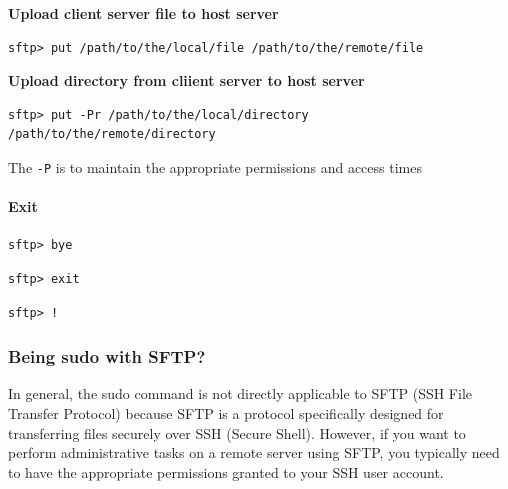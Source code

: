 \documentclass{article}
\newenvironment{blocktemplateI}[1]{%
    \tcolorbox[beamer,%
    noparskip,breakable,
    colframe=Violet,%
    colbacklower=Black,%
    title=#1]}%
    {\endtcolorbox}
\newenvironment{codetemplate}[1][]{%
  \mybasecolorbox[#1]
  \itshape
}{%
  \endmybasecolorbox
}
\begin{document}
\textbf{Upload client server file to host server}
\begin{codetemplate}{}
\begin{verbatim}
sftp> put /path/to/the/local/file /path/to/the/remote/file
\end{verbatim}
\end{codetemplate}

\textbf{Upload directory from cliient server to host server}
\begin{codetemplate}{}
\begin{verbatim}
sftp> put -Pr /path/to/the/local/directory /path/to/the/remote/directory
\end{verbatim}
\end{codetemplate}

\begin{blocktemplateI}{NOTE}
The \verb|-P| is to maintain the appropriate permissions and access times
\end{blocktemplateI}

\paragraph{Exit}
\begin{codetemplate}{}
\begin{verbatim}
sftp> bye
\end{verbatim}
\end{codetemplate}

\begin{codetemplate}{}
\begin{verbatim}
sftp> exit
\end{verbatim}
\end{codetemplate}

\begin{codetemplate}{}
\begin{verbatim}
sftp> !
\end{verbatim}
\end{codetemplate}

\subsubsection{Being sudo with SFTP?}


In general, the sudo command is not directly applicable to SFTP (SSH File Transfer Protocol) because SFTP is a protocol specifically designed for transferring files securely over SSH (Secure Shell). However, if you want to perform administrative tasks on a remote server using SFTP, you typically need to have the appropriate permissions granted to your SSH user account.
\end{document}
